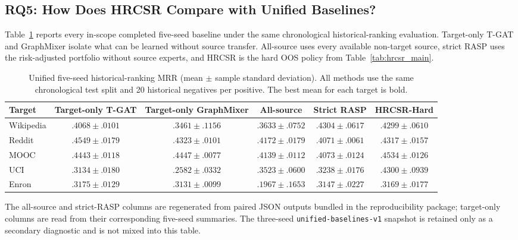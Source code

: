 \documentclass[journal]{IEEEtran}
\begin{document}
\subsection{RQ5: How Does HRCSR Compare with Unified Baselines?}
Table~\ref{tab:unified_mrr_baselines} reports every in-scope completed five-seed baseline under the same chronological historical-ranking evaluation. Target-only T-GAT and GraphMixer isolate what can be learned without source transfer. All-source uses every available non-target source, strict RASP uses the risk-adjusted portfolio without source experts, and HRCSR is the hard OOS policy from Table~\ref{tab:hrcsr_main}.

\begin{table}[t]
\centering
\caption{Unified five-seed historical-ranking MRR (mean $\pm$ sample standard deviation). All methods use the same chronological test split and 20 historical negatives per positive. The best mean for each target is bold.}
\label{tab:unified_mrr_baselines}
\scriptsize
\setlength{\tabcolsep}{3.4pt}
\begin{tabular}{lccccc}
\toprule
\textbf{Target} & \textbf{Target-only T-GAT} & \textbf{Target-only GraphMixer} & \textbf{All-source} & \textbf{Strict RASP} & \textbf{HRCSR-Hard} \\
\midrule
Wikipedia & $.4068\pm.0101$ & $.3461\pm.1156$ & $.3633\pm.0752$ & $\mathbf{.4304\pm.0617}$ & $.4299\pm.0610$ \\
Reddit    & $\mathbf{.4549\pm.0179}$ & $.4323\pm.0101$ & $.4172\pm.0179$ & $.4071\pm.0061$ & $.4317\pm.0157$ \\
MOOC      & $.4443\pm.0118$ & $.4447\pm.0077$ & $.4139\pm.0112$ & $.4073\pm.0124$ & $\mathbf{.4534\pm.0126}$ \\
UCI       & $.3134\pm.0180$ & $.2582\pm.0332$ & $.3523\pm.0600$ & $.3238\pm.0176$ & $\mathbf{.4300\pm.0939}$ \\
Enron     & $\mathbf{.3175\pm.0129}$ & $.3131\pm.0099$ & $.1967\pm.1653$ & $.3147\pm.0227$ & $.3169\pm.0177$ \\
\bottomrule
\end{tabular}
\end{table}

The all-source and strict-RASP columns are regenerated from paired JSON
outputs bundled in the reproducibility package; target-only columns are read
from their corresponding five-seed summaries. The three-seed
\texttt{unified-baselines-v1} snapshot is retained only as a secondary
diagnostic and is not mixed into this table.
\end{document}
